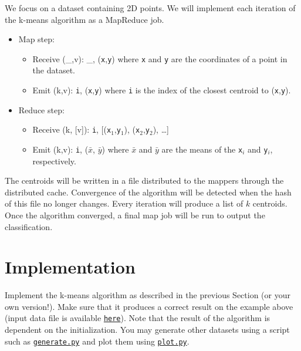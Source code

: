 \documentclass[11pt]{article}
\begin{document}
We focus on a dataset containing 2D points. We will implement each
iteration of the k-means algorithm as a MapReduce job.
\begin{itemize}
\item Map step:
  \begin{itemize}
  \item Receive (\_,v): \_, (\texttt{x},\texttt{y}) \newline
    where \texttt{x} and \texttt{y} are the coordinates of a point in the dataset.
  \item Emit (k,v): \texttt{i}, (\texttt{x},\texttt{y}) \newline
    where \texttt{i} is the index of the closest centroid to (\texttt{x},\texttt{y}).
  \end{itemize}
\item Reduce step:
  \begin{itemize}
  \item Receive (k, [v]): \texttt{i}, [(\texttt{x$_1$},\texttt{y$_1$}), (\texttt{x$_2$},\texttt{y$_2$}), \ldots]
  \item Emit (k,v): \texttt{i}, (\texttt{$\bar x$}, \texttt{$\bar y$}) \newline
    where \texttt{$\bar x$} and \texttt{$\bar y$} are the means of the \texttt{x$_i$} and \texttt{y$_i$}, respectively.
  \end{itemize}
\end{itemize}
The centroids will be written in a file distributed to the mappers
through the distributed cache. Convergence of the algorithm will be
detected when the hash of this file no longer changes. Every iteration
will produce a list of $k$ centroids. Once the algorithm converged, a
final map job will be run to output the classification.


\section{Implementation}

Implement the k-means algorithm as described in the previous Section
(or your own version!). Make sure that it produces a correct result on
the example above (input data file is available
\href{https://github.com/glatard/big-data-analytics-course/raw/master/labs/kmeans/data-4-1000-points-3.txt}{\texttt{here}}). Note
that the result of the algorithm is dependent on the
initialization. You may generate other datasets using a script such as
\href{https://github.com/glatard/big-data-analytics-course/raw/master/labs/kmeans/generate.py}{\texttt{generate.py}}
and plot them using
\href{https://github.com/glatard/big-data-analytics-course/raw/master/labs/kmeans/plot.py}{\texttt{plot.py}}.
\end{document}
